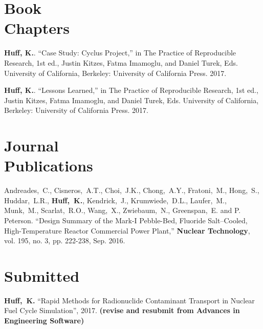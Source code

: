 \documentclass[margin,line]{resume}
\newcommand{\Cyclus}{\textsc{Cyclus}\xspace}%
\begin{document}
\begin{resume}
    \section{\mysidestyle Book\\Chapters}
      \begin{bibenum} 
      \item \textbf{Huff, K.}. ``Case Study: Cyclus Project,'' in The Practice 
              of Reproducible Research, 1st ed., Justin Kitzes, Fatma Imamoglu, 
              and Daniel Turek, Eds. University of California, Berkeley: 
              University of California Press. 2017.
      \item \textbf{Huff, K.}. ``Lessons Learned,'' in The Practice of Reproducible 
              Research, 1st ed., Justin Kitzes, Fatma Imamoglu, and Daniel 
              Turek, Eds. University of California, Berkeley: University of 
              California Press. 2017.
      \end{bibenum}

    \section{\mysidestyle Journal\\Publications}
      \begin{bibenum}
      \item Andreades,~C., Cisneros,~A.T., Choi,~J.K., Chong,~A.Y., 
              Fratoni,~M., Hong,~S., Huddar,~L.R., \textbf{Huff,~K.}, Kendrick,~J., 
              Krumwiede,~D.L., Laufer,~M., Munk,~M., Scarlat,~R.O., Wang,~X., 
              Zwiebaum,~N., Greenspan,~E. and P. Peterson.  ``Design Summary of 
              the Mark-I Pebble-Bed, Fluoride Salt–Cooled, High-Temperature 
              Reactor Commercial Power Plant,'' \textbf{Nuclear Technology}, vol. 195, 
              no. 3, pp. 222-238, Sep. 2016.
      \end{bibenum}
    \section{\mysidestyle Submitted}
      \begin{bibenum}
       \item \textbf{Huff,~K.} ``Rapid Methods for Radionuclide Contaminant
       Transport in Nuclear Fuel Cycle Simulation'', 2017. \textbf{(revise and 
              resubmit from Advances in Engineering Software)}
      \end{bibenum}

\end{resume}
\end{document}
